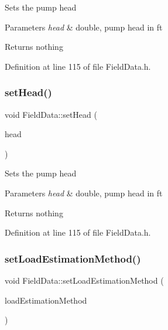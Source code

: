 Sets the pump head


\begin{DoxyParams}{Parameters}
{\em head} & double, pump head in ft\\
\hline
\end{DoxyParams}
\begin{DoxyReturn}{Returns}
nothing 
\end{DoxyReturn}


Definition at line 115 of file Field\+Data.\+h.

\mbox{\label{class_field_data_ac72a4f958930000bab0e2b772ee26711}} 
\subsubsection{\texorpdfstring{set\+Head()}{setHead()}\hspace{0.1cm}{\footnotesize\ttfamily [3/3]}}
{\footnotesize\ttfamily void Field\+Data\+::set\+Head (\begin{DoxyParamCaption}\item[{double}]{head }\end{DoxyParamCaption})\hspace{0.3cm}{\ttfamily [inline]}}

Sets the pump head


\begin{DoxyParams}{Parameters}
{\em head} & double, pump head in ft\\
\hline
\end{DoxyParams}
\begin{DoxyReturn}{Returns}
nothing 
\end{DoxyReturn}


Definition at line 115 of file Field\+Data.\+h.

\mbox{\label{class_field_data_a7d1103b1832956d96146cbe26fb34a6d}} 
\subsubsection{\texorpdfstring{set\+Load\+Estimation\+Method()}{setLoadEstimationMethod()}\hspace{0.1cm}{\footnotesize\ttfamily [1/3]}}
{\footnotesize\ttfamily void Field\+Data\+::set\+Load\+Estimation\+Method (\begin{DoxyParamCaption}\item[{\hyperlink{class_field_data_a424e89914ba5684c01bb269dbe3312fd}{Load\+Estimation\+Method}}]{load\+Estimation\+Method }\end{DoxyParamCaption})\hspace{0.3cm}{\ttfamily [inline]}}


